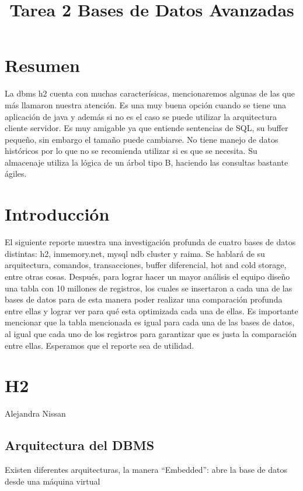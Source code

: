 \documentclass{acmart}
\title{Tarea 2 Bases de Datos Avanzadas}
\begin{document}
\maketitle

\tableofcontents

\section{Resumen}
La dbms h2 cuenta con muchas caracterísicas, mencionaremos algunas de las que más llamaron nuestra atención. Es una muy buena opción cuando se tiene una aplicación de java y además si no es el caso se puede utilizar la arquitectura cliente servidor. Es muy amigable ya que entiende sentencias de SQL, su buffer pequeño, sin embargo el tamaño puede cambiarse. No tiene manejo de datos históricos por lo que no se recomienda utilizar si es que se necesita. Su almacenaje utiliza la lógica de un árbol tipo B, haciendo las consultas bastante ágiles.

\section{Introducción}
El siguiente reporte muestra una investigación profunda de cuatro bases de datos distintas: h2, inmemory.net, mysql ndb cluster y raima. Se hablará de su arquitectura, comandos, transacciones, buffer diferencial, hot and cold storage, entre otras cosas. Después, para lograr hacer un mayor análisis el equipo diseño una tabla  con 10 millones de registros, los cuales se insertaron a cada una de las bases de datos para de esta manera poder realizar una comparación profunda entre ellas y lograr ver para qué esta optimizada cada una de ellas. Es importante mencionar que la tabla mencionada es igual para cada una de las bases de datos, al igual que cada uno de los registros para garantizar que es justa la comparación entre ellas. Esperamos que el reporte sea de utilidad. 

\section{H2}

Alejandra Nissan 



\subsection{Arquitectura del DBMS}

Existen diferentes arquitecturas, la manera “Embedded”: abre la base de datos desde una máquina virtual
\end{document}
